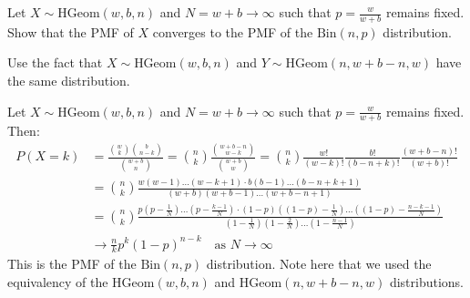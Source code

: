  \begin{exercise}
 	Let $X \sim \text{HGeom}(w, b, n)$ and $N = w + b \to \infty$ such that $p = \frac{w}{w + b}$ remains fixed. Show that the PMF of $X$ converges to the PMF of the $\text{Bin}(n,p)$ distribution.
	\begin{hint}
		Use the fact that $X \sim \text{HGeom}(w, b, n)$ and $Y \sim \text{HGeom}(n, w + b - n, w)$ have the same distribution.
	\end{hint}
	\begin{solution}
		Let $X \sim \text{HGeom}(w, b, n)$ and $N = w + b \to \infty$ such that $p = \frac{w}{w + b}$ remains fixed. Then:
		\begin{align*}
			P(X = k) & = \frac{\binom{w}{k} \binom{b}{n - k}}{\binom{w + b}{n}} = \binom{n}{k} \frac{\binom{w + b - n}{w - k}}{\binom{w + b}{w}} = \binom{n}{k} \frac{w!}{(w - k)!} \frac{b!}{(b - n + k)!} \frac{(w + b - n)!}{(w + b)!} \\
			& = \binom{n}{k} \frac{w(w - 1) \hdots (w - k + 1) \cdot b(b - 1) \hdots (b - n + k + 1)}{(w + b)(w + b - 1) \hdots (w + b - n + 1)} \\
			& = \binom{n}{k} \frac{p \left(p - \frac{1}{N}\right) \hdots \left(p - \frac{k - 1}{N}\right) \cdot (1 - p) \left((1 - p) - \frac{1}{N}\right) \hdots \left((1 - p) - \frac{n - k - 1}{N}\right)}{\left(1 - \frac{1}{N}\right) \left(1 - \frac{2}{N}\right) \hdots \left(1 - \frac{n - 1}{N}\right)} \\
			& \to \frac{n}{k} p^k (1 - p)^{n - k} \quad \text{as } N \to \infty
		\end{align*}
		This is the PMF of the $\text{Bin}(n,p)$ distribution. Note here that we used the equivalency of the $\text{HGeom}(w, b, n)$ and $\text{HGeom}(n, w + b - n, w)$ distributions.
	\end{solution}
\end{exercise}








